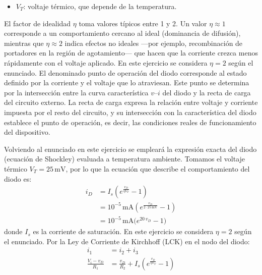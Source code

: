\documentclass[
  11pt,
  letterpaper,
   addpoints,
   answers
  ]{exam}
\begin{document}
\begin{questions}
\begin{solution}
\begin{itemize}
    \item $V_T$: voltaje térmico, que depende de la temperatura.
\end{itemize}
El factor de idealidad $\eta$ toma valores típicos entre 1 y 2. Un valor \(\eta\approx 1\) corresponde a un comportamiento cercano al ideal (dominancia de difusión), mientras que \(\eta\approx 2\) indica efectos no ideales —por ejemplo, recombinación de portadores en la región de agotamiento— que hacen que la corriente crezca menos rápidamente con el voltaje aplicado. En este ejercicio se considera \(\eta=2\) según el enunciado.
El denominado punto de operación del diodo corresponde al estado definido por la corriente y el voltaje que lo atraviesan. Este punto se determina por la intersección entre la curva característica $v$--$i$ del diodo y la recta de carga del circuito externo. La recta de carga expresa la relación entre voltaje y corriente impuesta por el resto del circuito, y su intersección con la característica del diodo establece el punto de operación, es decir, las condiciones reales de funcionamiento del dispositivo.

Volviendo al enunciado en este ejercicio se empleará la expresión exacta del diodo (ecuación de Shockley) evaluada a temperatura ambiente. Tomamos el voltaje térmico $V_T=25\,\mathrm{mV}$, por lo que la ecuación que describe el comportamiento del diodo es:
\begin{align}
    i_D &= I_s\left(e^{\frac{v_D}{\eta V_T}} - 1\right) \label{eq:shockley}\\
    &= 10^{-5}\,\mathrm{mA}\left(e^{\frac{v_D}{2 \cdot 25\,\mathrm{mV}}} - 1\right)\\
    &=10^{-5}\,\mathrm{mA}\big(e^{20\,v_{D}}-1\big)
\end{align}
donde $I_s$ es la corriente de saturación. En este ejercicio se considera $\eta = 2$ según el enunciado. Por la Ley de Corriente de Kirchhoff (LCK) en el nodo del diodo:
\begin{align}
    i_1 &= i_2 + i_3 \\
\frac{V_i - v_D}{R_1} &= \frac{v_D}{R_2} + I_s\left(e^{\frac{v_D}{\eta V_T}} - 1\right) \label{eq:kcl}
\end{align}


\end{solution}
\end{questions}
\end{document}
